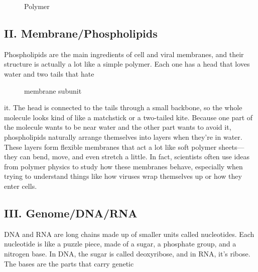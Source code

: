 \documentclass[12pt]{article}
\begin{document}
\begin{flushleft}
\begin{figure}[!ht]
  \centering
  
  \caption{Polymer}
\end{figure}





\subsection*{II. Membrane/Phospholipids}
Phospholipids are the main ingredients of cell and viral membranes, and their structure is actually a lot like a simple polymer. Each one has a head that loves water and two tails that hate 

\begin{figure}[!ht]
  \centering
  \caption{membrane subunit}
\end{figure}



\noindent it. The head is connected to the tails through a small backbone, so the whole molecule looks kind of like a matchstick or a two-tailed kite. Because one part of the molecule wants to be near water and the other part wants to avoid it, phospholipids naturally arrange themselves into layers when they’re in water. These layers form flexible membranes that act a lot like soft polymer sheets—they can bend, move, and even stretch a little. In fact, scientists often use ideas from polymer physics to study how these membranes behave, especially when trying to understand things like how viruses wrap themselves up or how they enter cells.


\subsection*{III. Genome/DNA/RNA}
DNA and RNA are long chains made up of smaller units called nucleotides. Each nucleotide is like a puzzle piece, made of a sugar, a phosphate group, and a nitrogen base. In DNA, the sugar is called deoxyribose, and in RNA, it’s ribose. The bases are the parts that carry genetic 


\end{flushleft}
\end{document}

